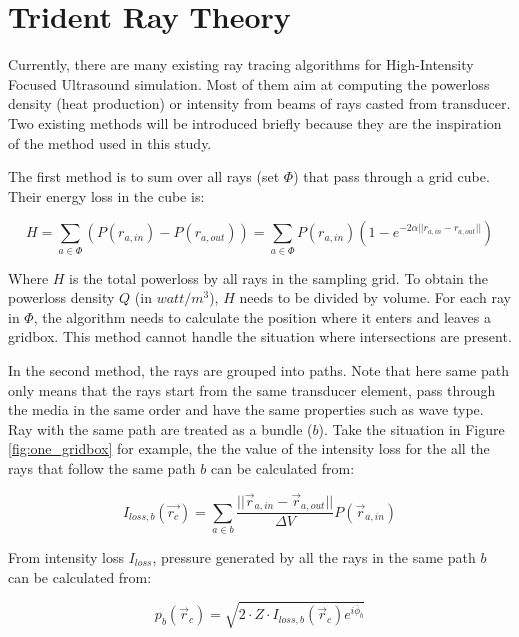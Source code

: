 
\section{Trident Ray Theory} \label{sec:trident_theory}

Currently, there are many existing ray tracing algorithms for High-Intensity Focused Ultrasound simulation. Most of them aim at computing the powerloss density (heat production) or intensity from beams of rays casted from transducer. Two existing methods will be introduced briefly because they are the inspiration of the method used in this study.

The first method is to sum over all rays (set $\Phi$) that pass through a grid cube. Their energy loss in the cube is:

\begin{equation} \label{eq:first_rc}
    H = \sum_{a \in \Phi} (P(r_{a,in}) - P(r_{a,out})) = \sum_{a \in \Phi} P(r_{a,in})(1-e^{-2\alpha ||r_{a,in} - r_{a,out}||})
\end{equation}

Where $H$ is the total powerloss by all rays in the sampling grid. To obtain the powerloss density $Q$ (in $watt/m^3$), $H$ needs to be divided by volume. For each ray in $\Phi$, the algorithm needs to calculate the position where it enters and leaves a gridbox. This method cannot handle the situation where intersections are present.

In the second method, the rays are grouped into paths. Note that here same path only means that the rays start from the same transducer element, pass through the media in the same order and have the same properties such as wave type. Ray with the same path are treated as a bundle ($b$). Take the situation in Figure \ref{fig:one_gridbox} for example, the the value of the intensity loss for the all the rays that follow the same path $b$ can be calculated from:

\begin{equation} \label{eq:calc_I_Loss}
    I_{loss,b}(\vec{r_c})=\sum_{a \in b} \frac{||\vec{r}_{a,in}-\vec{r}_{a,out}||}{\Delta V} P(\vec{r}_{a,in})
\end{equation}

From intensity loss $I_{loss}$, pressure generated by all the rays in the same path $b$ can be calculated from:

\begin{equation} \label{eq:pressure_calculation}
    p_b(\vec{r}_c)=\sqrt{2\cdot Z\cdot I_{loss,b}(\vec{r}_c)e^{i\bar{\phi}_b}}
\end{equation}

